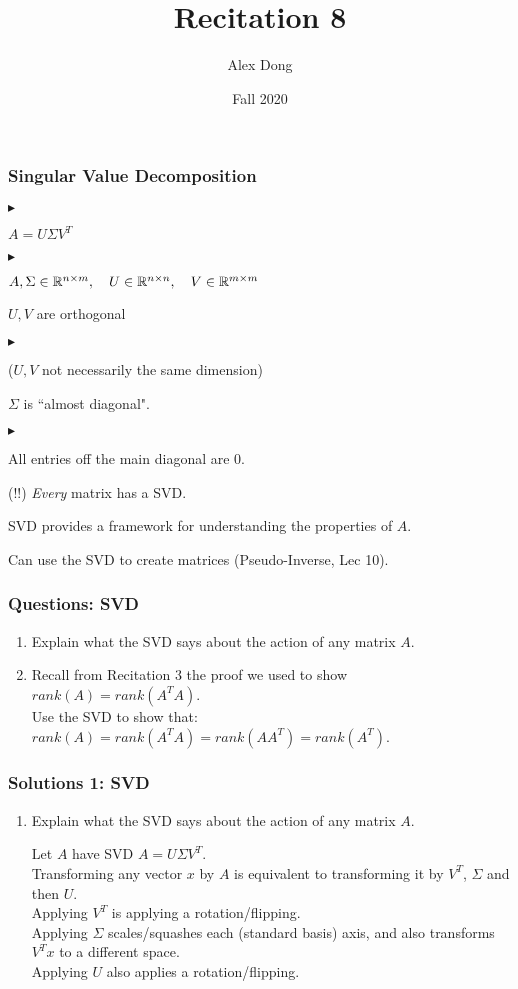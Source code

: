 \documentclass{beamer}
\title{Recitation 8}
\author{Alex Dong}
\institute{CDS, NYU}
\date{Fall 2020}
\renewenvironment{itemize}
\renewenvironment{enumerate}%
{\begin{list}{\arabic{enumi}.}%
      {\setlength{\leftmargin}{2.5em}%
       \setlength{\itemsep}{-\parsep}%
       \setlength{\topsep}{-\parskip}%
       \usecounter{enumi}}%
 }{\end{list}}
\renewenvironment{itemize}%
{\begin{list}{$\blacktriangleright$}%
      {\setlength{\leftmargin}{2.5em}%
       \setlength{\itemsep}{-\parsep}%
       \setlength{\topsep}{-\parskip}%
       \usecounter{enumi}}%
 }{\end{list}}
\begin{document}
\frame{\titlepage} 

\begin{frame}
\frametitle{Singular Value Decomposition}
\begin{itemize}
\item $A = U\Sigma V^T$
\begin{itemize}
\item $A, \Sigma \in \mathbb{R}^{n \times m},\quad U \in \mathbb{R}^{n\times n},\quad V \in \mathbb{R}^{m\times m}$
\item $U,V$ are orthogonal
\begin{itemize}
\item ($U,V$ not necessarily the same dimension)
\end{itemize}
\item $\Sigma$ is ``almost diagonal". 
\begin{itemize}
\item All entries off the main diagonal are 0.
\end{itemize}
\end{itemize}
\item (!!) \textit{Every} matrix has a SVD.
\item SVD provides a framework for understanding the properties of $A$.
\item Can use the SVD to create matrices (Pseudo-Inverse, Lec 10).
\end{itemize}
\end{frame}

\begin{frame}
\frametitle{Questions: SVD}
\begin{enumerate}
\item Explain what the SVD says about the action of any matrix $A$.
\medskip

\item Recall from Recitation 3 the proof we used to show\\
\qquad $rank(A) = rank(A^TA)$.\\
 Use the SVD to show that:\\
 \qquad $rank(A)=rank(A^TA)=rank(AA^T)=rank(A^T)$.
\medskip
\end{enumerate}

\end{frame}


\begin{frame}
\frametitle{Solutions 1: SVD}
\begin{enumerate}
\item Explain what the SVD says about the action of any matrix $A$.
\begin{solution}
Let $A$ have SVD $A=U\Sigma V^T$.\\
Transforming any vector $x$ by $A$ is equivalent to transforming it by $V^T$, $\Sigma$ and then $U$. \\
Applying $V^T$ is applying a rotation/flipping.\\
Applying $\Sigma$ scales/squashes each (standard basis) axis, and also transforms $V^Tx$ to a different space.\\
Applying $U$ also applies a rotation/flipping.
\end{solution}
\end{enumerate}
\end{frame}
\end{document}
